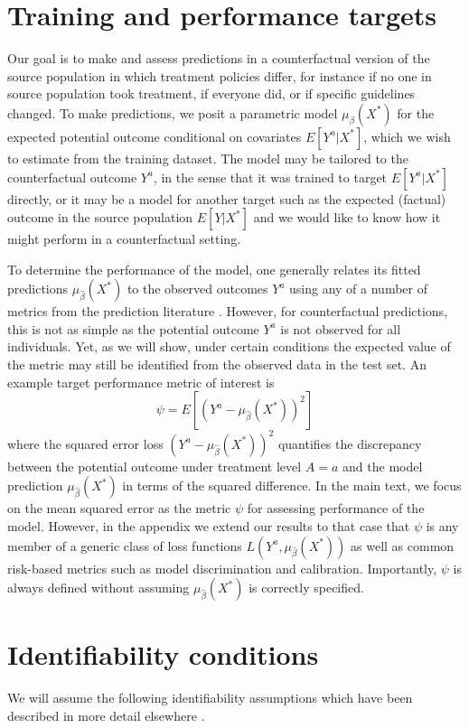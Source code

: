 \section{Training and performance targets} \label{sec:targets}
Our goal is to make and assess predictions in a counterfactual version of the source population in which treatment policies differ, for instance if no one in source population took treatment, if everyone did, or if specific guidelines changed. To make predictions, we posit a parametric model $\mu_{\beta}(X^*)$ for the expected potential outcome conditional on covariates $E[Y^a | X^*]$, which we wish to estimate from the training dataset. The model may be tailored to the counterfactual outcome $Y^a$, in the sense that it was trained to target $E[Y^a | X^*]$ directly, or it may be a model for another target such as the  expected (factual) outcome in the source population $E[Y | X^*]$ and we would like to know how it might perform in a counterfactual setting.

To determine the performance of the model, one generally relates its fitted predictions $\mu_{\widehat{\beta}}(X^*)$ to the observed outcomes $Y^a$ using any of a number of metrics from the prediction literature \cite{harrell_multivariable_1996,steyerberg_clinical_2019,altman_what_2000}. However, for counterfactual predictions, this is not as simple as the potential outcome $Y^a$ is not observed for all individuals. Yet, as we will show, under certain conditions the expected value of the metric may still be identified from the observed data in the test set. An example target performance metric of interest is 
\begin{equation*}
    \psi = E[(Y^a - \mu_{\widehat{\beta}}(X^*))^2]
\end{equation*}
where the squared error loss $(Y^a - \mu_{\widehat{\beta}}(X^*))^2$ quantifies the discrepancy between the potential outcome under treatment level $A = a$ and the model prediction $\mu_{\widehat{\beta}}(X^*)$ in terms of the squared difference. In the main text, we focus on the mean squared error as the metric $\psi$ for assessing performance of the model. However, in the appendix we extend our results to that case that $\psi$ is any member of a generic class of loss functions $L(Y^a,  \mu_{\widehat{\beta}}(X^*))$ as well as common risk-based metrics such as model discrimination and calibration. Importantly, $\psi$ is always defined without assuming $\mu_{\widehat{\beta}}(X^*)$ is correctly specified.

\section{Identifiability conditions} \label{sec:identifiability}
We will assume the following identifiability assumptions which have been described in more detail elsewhere \cite{hernan_causal_2020,robins_new_1986,robins_graphical_1987}.

